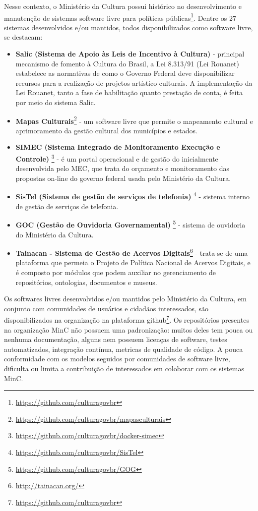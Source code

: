 Nesse contexto, o Ministério da Cultura possui histórico no desenvolvimento e manutenção de sistemas
software livre para políticas públicas\footnote{\url{https://github.com/culturagovbr}}.
Dentre os 27 sistemas desenvolvidos e/ou mantidos, todos disponibilizados como software livre,
se destacam:

\begin{itemize}
\item \textbf{Salic (Sistema de Apoio às Leis de Incentivo à Cultura)} - 
 principal mecanismo de fomento à Cultura do Brasil, a Lei 8.313/91 (Lei Rouanet) 
 estabelece as normativas de como o Governo Federal deve disponibilizar recursos 
 para a realização de projetos artístico-culturais. A implementação da Lei 
 Rouanet, tanto a fase de habilitação quanto prestação de conta, é feita por 
 meio do sistema Salic.
 \item \textbf{Mapas Culturais}\footnote{\url{https://github.com/culturagovbr/mapasculturais}} - 
 um software livre que permite o mapeamento cultural e aprimoramento da gestão 
 cultural dos municípios e estados.
 \item \textbf{SIMEC (Sistema Integrado de Monitoramento Execução e Controle)}
 \footnote{\url{https://github.com/culturagovbr/docker-simec}} - é um portal 
 operacional e de gestão do inicialmente desenvolvida pelo MEC, que trata do 
 orçamento e monitoramento das propostas on-line do governo federal usada pelo 
 Ministério da Cultura.
 \item \textbf{SisTel (Sistema de gestão de serviços de telefonia)}
 \footnote{\url{https://github.com/culturagovbr/SisTel}} - sistema interno de 
 gestão de serviços de telefonia.
 \item \textbf{GOC (Gestão de Ouvidoria Governamental)}
 \footnote{\url{https://github.com/culturagovbr/GOG}} - sistema de ouvidoria do 
 Ministério da Cultura.
 \item \textbf{Tainacan - Sistema de Gestão de Acervos Digitais}\footnote{\url{http://tainacan.org/}} - trata-se de uma plataforma que permeia o Projeto de Política Nacional de Acervos Digitais,
 e é composto
 por módulos que podem auxiliar no gerenciamento de repositórios, ontologias, documentos e museus.
\end{itemize}

Os softwares livres desenvolvidos e/ou mantidos pelo Ministério da Cultura, em conjunto com comunidades de
usuários e cidadãos interessados, são disponibilizados na organização na plataforma github\footnote{\url{https://github.com/culturagovbr}}.
Os repositórios presentes na organização MinC não possuem uma padronização: muitos deles tem pouca ou nenhuma documentação, alguns nem possuem licenças
de software, testes automatizados, integração contínua, metricas de qualidade de código. A pouca conformidade com os modelos seguidos por
comunidades de software livre, dificulta ou limita a contribuição de interessados em coloborar com os sistemas MinC.

